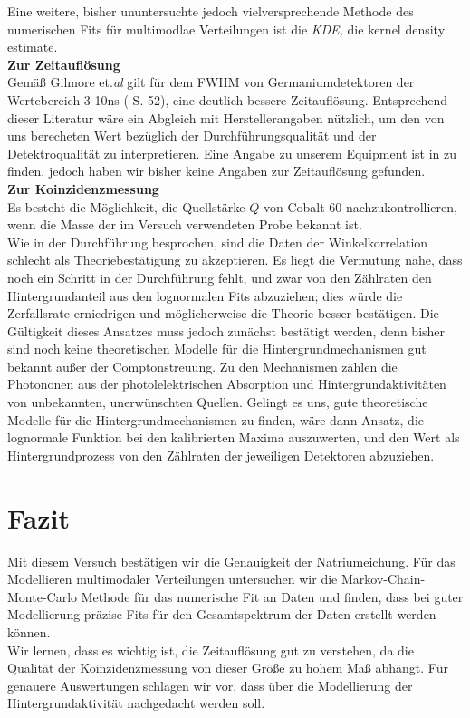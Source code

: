 \documentclass[%
aps,
onecolumn,
11pt,
tightenlines,
nofootinbib,
superscriptaddress,
floatfix,
prd,
]{revtex4-2}
\begin{document}
Eine weitere, bisher ununtersuchte jedoch vielversprechende Methode des numerischen Fits für multimodlae Verteilungen ist die \textit{KDE,} die kernel density estimate.\vspace{10pt}\\
\textbf{Zur Zeitauflösung}\\
Gemäß Gilmore et.\textit{al} gilt für dem FWHM von Germaniumdetektoren der Wertebereich 3-10ns (\cite{gilmore2008practical} S. 52), eine deutlich bessere Zeitauflösung. Entsprechend dieser Literatur wäre ein Abgleich mit Herstellerangaben nützlich, um den von uns berecheten Wert bezüglich der Durchführungsqualität und der Detektroqualität zu interpretieren. Eine Angabe zu unserem Equipment ist in \cite{ortec} zu finden, jedoch haben wir bisher keine Angaben zur Zeitauflösung gefunden.\vspace{10pt}\\
\textbf{Zur Koinzidenzmessung}\\
Es besteht die Möglichkeit, die Quellstärke $Q$ von Cobalt-60 nachzukontrollieren, wenn die Masse der im Versuch verwendeten Probe bekannt ist.\\
Wie in der Durchführung besprochen, sind die Daten der Winkelkorrelation schlecht als Theoriebestätigung zu akzeptieren. Es liegt die Vermutung nahe, dass noch ein Schritt in der Durchführung fehlt, und zwar von den Zählraten den Hintergrundanteil aus den lognormalen Fits abzuziehen; dies würde die Zerfallsrate erniedrigen und möglicherweise die Theorie besser bestätigen. Die Gültigkeit dieses Ansatzes muss jedoch zunächst bestätigt werden, denn bisher sind noch keine theoretischen Modelle für die Hintergrundmechanismen gut bekannt außer der Comptonstreuung. Zu den Mechanismen zählen die Photononen aus der photolelektrischen Absorption und Hintergrundaktivitäten von unbekannten, unerwünschten Quellen. Gelingt es uns, gute theoretische Modelle für die Hintergrundmechanismen zu finden, wäre dann Ansatz, die lognormale Funktion bei den kalibrierten Maxima auszuwerten, und den Wert als Hintergrundprozess von den Zählraten der jeweiligen Detektoren abzuziehen. 





\section{Fazit}
\label{sec:Fazit}
Mit diesem Versuch bestätigen wir die Genauigkeit der Natriumeichung. Für das Modellieren multimodaler Verteilungen untersuchen wir die Markov-Chain-Monte-Carlo Methode für das numerische Fit an Daten und finden, dass bei guter Modellierung präzise Fits für den Gesamtspektrum der Daten erstellt werden können. \\
Wir lernen, dass es wichtig ist, die Zeitauflösung gut zu verstehen, da die Qualität der Koinzidenzmessung von dieser Größe zu hohem Maß abhängt. Für genauere Auswertungen schlagen wir vor, dass über die Modellierung der Hintergrundaktivität nachgedacht werden soll. 
\end{document}
